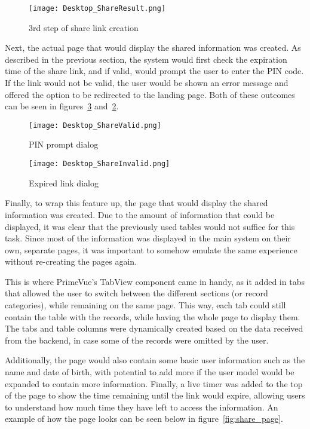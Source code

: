 \begin{figure}[htbp]
  \centering
  \texttt{[image: Desktop\_ShareResult.png]}
  \caption{3rd step of share link creation}\label{fig:share_result}
\end{figure}

\FloatBarrier{}

Next, the actual page that would display the shared information was created. As described in the previous section, the system would first check the expiration time of the share link, and if valid, would prompt the user to enter the PIN code. If the link would not be valid, the user would be shown an error message and offered the option to be redirected to the landing page. Both of these outcomes can be seen in figures~\ref{fig:share_invalid} and~\ref{fig:share_valid}.

\begin{figure}[htbp]
  \centering
  \texttt{[image: Desktop\_ShareValid.png]}
  \caption{PIN prompt dialog}\label{fig:share_valid}
\end{figure}

\begin{figure}[htbp]
  \centering
  \texttt{[image: Desktop\_ShareInvalid.png]}
  \caption{Expired link dialog}\label{fig:share_invalid}
\end{figure}

\FloatBarrier{}

Finally, to wrap this feature up, the page that would display the shared information was created. Due to the amount of information that could be displayed, it was clear that the previously used tables would not suffice for this task. Since most of the information was displayed in the main system on their own, separate pages, it was important to somehow emulate the same experience without re-creating the pages again. 

This is where PrimeVue's TabView component came in handy, as it added in tabs that allowed the user to switch between the different sections (or record categories), while remaining on the same page. This way, each tab could still contain the table with the records, while having the whole page to display them. The tabs and table columns were dynamically created based on the data received from the backend, in case some of the records were omitted by the user.

Additionally, the page would also contain some basic user information such as the name and date of birth, with potential to add more if the user model would be expanded to contain more information. Finally, a live timer was added to the top of the page to show the time remaining until the link would expire, allowing users to understand how much time they have left to access the information. An example of how the page looks can be seen below in figure~\ref{fig:share_page}.

